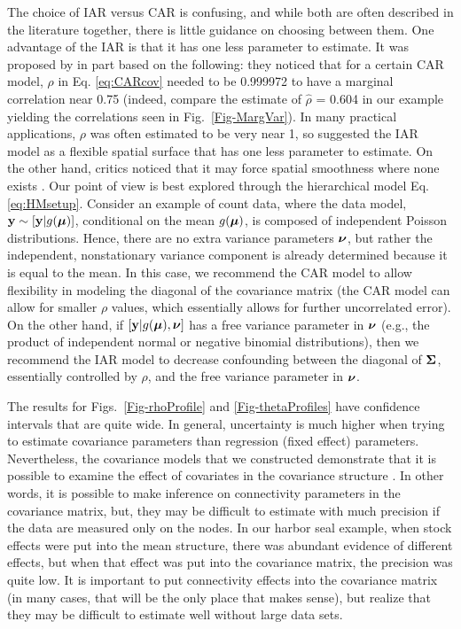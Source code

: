 \documentclass[11pt, titlepage]{article}\usepackage[]{graphicx}\usepackage[]{color}
\begin{document}
\begin{spacing}{1.9}
\begin{flushleft}
The choice of IAR versus CAR is confusing, and while both are often described in the literature together, there is little guidance on choosing between them.  One advantage of the IAR is that it has one less parameter to estimate.  It was proposed by \citet{Besa:Koop:cond:1995} in part based on the following: they noticed that for a certain CAR model, $\rho$ in Eq. \ref{eq:CARcov} needed to be 0.999972 to have a marginal correlation near 0.75 (indeed, compare the estimate of $\hat{\rho}$ = 0.604 in our example yielding the correlations seen in Fig.~\ref{Fig-MargVar}). In many practical applications, $\rho$ was often estimated to be very near 1, so \citet{Besa:Koop:cond:1995} suggested the IAR model as a flexible spatial surface that has one less parameter to estimate.  On the other hand, critics noticed that it may force spatial smoothness where none exists \citep[e.g.,][]{Lero:Lei:Bres:esti:2000}. Our point of view is best explored through the hierarchical model Eq. \ref{eq:HMsetup}.  Consider an example of count data, where the data model, $\mathbf{y} \sim [\mathbf{y}|g(\mbox{\boldmath $\mu$})]$, conditional on the mean $g(\mbox{\boldmath $\mu$})$, is composed of independent Poisson distributions. Hence, there are no extra variance parameters $\mbox{\boldmath $\nu$}$, but rather the independent, nonstationary variance component is already determined because it is equal to the mean. In this case, we recommend the CAR model to allow flexibility in modeling the diagonal of the covariance matrix (the CAR model can allow for smaller $\rho$ values, which essentially allows for further uncorrelated error).  On the other hand, if $[\mathbf{y}|g(\mbox{\boldmath $\mu$}),\mbox{\boldmath $\nu$}]$ has a free variance parameter in $\mbox{\boldmath $\nu$}$ (e.g., the product of independent normal or negative binomial distributions), then we recommend the IAR model to decrease confounding between the diagonal of $\mbox{\boldmath $\Sigma$}$, essentially controlled by $\rho$, and the free variance parameter in $\mbox{\boldmath $\nu$}$.

The results for Figs.~\ref{Fig-rhoProfile} and \ref{Fig-thetaProfiles} have confidence intervals that are quite wide.  In general, uncertainty is much higher when trying to estimate covariance parameters than regression (fixed effect) parameters. Nevertheless, the covariance models that we constructed demonstrate that it is possible to examine the effect of covariates in the covariance structure \citep[see also][]{Hank:Hoot:circ:2013}.  In other words, it is possible to make inference on connectivity parameters in the covariance matrix, but, they may be difficult to estimate with much precision if the data are measured only on the nodes.  In our harbor seal example, when stock effects were put into the mean structure, there was abundant evidence of different effects, but when that effect was put into the covariance matrix, the precision was quite low.  It is important to put connectivity effects into the covariance matrix (in many cases, that will be the only place that makes sense), but realize that they may be difficult to estimate well without large data sets.


\end{flushleft}
\end{spacing}
\end{document}
